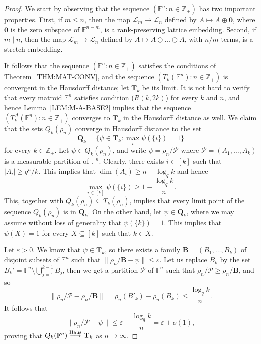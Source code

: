\documentclass[10pt,a4paper]{amsart}
\newcommand{\Haus}{{\text{\rm Haus}}}
\newcommand{\LL}{\mathcal{L}}
\newcommand{\bB}{\mathbf{B}}
\newcommand{\bQ}{\mathbf{Q}}
\newcommand{\bT}{\mathbf{T}}
\newcommand{\bbF}{\mathbb{F}}
\newcommand{\bbZ}{\mathbb{Z}}
\newcommand{\cP}{\mathcal{P}}
\newcommand{\eps}{\varepsilon}
\newcommand{\hto}{\stackrel{\Haus}{\longrightarrow}}
\begin{document}
\begin{proof}
We start by observing that the sequence $(\bbF^n\colon n\in\bbZ_+)$ has two important properties. First, if $m\le n$, then the map $\LL_m\to\LL_n$ defined by $A\mapsto A\oplus \mathbf{0}$, where $\mathbf{0}$ is the zero subspace of $\bbF^{n-m}$, is a rank-preserving lattice embedding. Second, if $m\mid n$, then the map $\LL_m\to\LL_n$ defined by $A\mapsto A\oplus\dots\oplus A$, with $n/m$ terms, is a stretch embedding. 

It follows that the sequence $(\bbF^n\colon n\in\bbZ_+)$ satisfies the conditions of Theorem~\ref{THM:MAT-CONV}, and the sequence $(T_k(\bbF^n)\colon n\in\bbZ_+)$ is
convergent in the Hausdorff distance; let $ \bT_k$ be its limit. It is not hard to verify that every matroid $\bbF^n$ satisfies condition
\hyperlink{rkm}{($R(k,2k)$)} for every $k$ and $n$, and hence Lemma~\ref{LEM:M-A-BASE2} implies
that the sequence $(T^\Delta_k(\bbF^n)\colon n\in\bbZ_+)$ converges to $ \bT_k$ in the
Hausdorff distance as well. We claim that the sets $Q_k(\rho_n)$ converge in Hausdorff distance to the set
\[
 \bQ_k=\{\psi\in \bT_k\colon \max_i\psi(\{i\})=1\}
\]
for every $k\in\bbZ_+$. Let $\psi\in Q_k(\rho_n)$, and write $\psi=\rho_n/\cP$ where $\cP=(A_1,\dots,A_k)$ is a measurable partition of $ \bbF^n$. Clearly,
there exists $i\in[k]$ such that $|A_i|\ge q^n/k$. This implies that
$\dim(A_i)\ge n-\log_q k$ and hence
\begin{equation*}\label{EQ:QQK1}
\max_{i\in[k]} \psi(\{i\}) \ge  1-\frac{\log_q k}{n}.
\end{equation*}
This, together with $Q_k(\rho_n)\subseteq T_k(\rho_n)$, implies that every limit point of the sequence
$Q_k(\rho_n)$ is in $\bQ_k$. On the other hand, let
$\psi\in \bQ_k$, where we may assume without loss of generality that $\psi(\{k\})=1$. This implies that $\psi(X)=1$ for every $X\subseteq [k]$ such that $k\in X$.

Let $\eps>0$. We know that $\psi \in \bT_k$, so there exists a family
$ \bB=(B_1,\dots,B_k)$ of disjoint subsets of $\bbF^n$ such that
$\|\rho_n/ \bB-\psi\|\le \eps$. Let us replace $B_k$ by the set
$B_k'=\bbF^n\setminus\bigcup_{j=1}^{k-1} B_j$, then we get a partition $\cP$ of
$\bbF^n$ such that $\rho_n/\cP\ge\rho_n/ \bB$, and so
\[
\|\rho_n/\cP-\rho_n/ \bB\|=\rho_n(B'_k)-\rho_n(B_k) \le \frac{\log_q k}{n}.
\]
It follows that 
\[
\|\rho_n/\cP-\psi\| \le \eps+\frac{\log_q k}{n} =\eps+o(1),
\]
proving that $Q_k(\bbF^n)\hto \bT_k$ as $n\to\infty$.
\end{proof}
\end{document}
